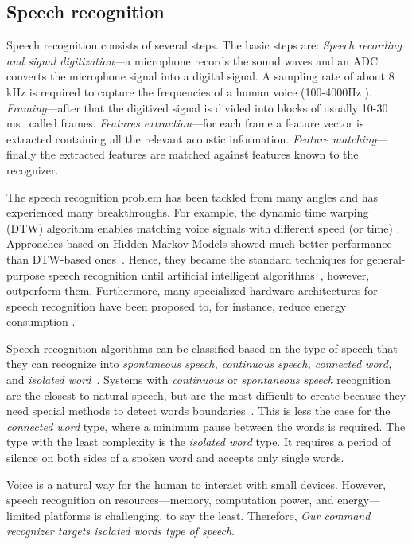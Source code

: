 \subsection{Speech recognition}
 Speech recognition consists of several steps. The basic steps are:
\textit{Speech recording and signal digitization}---a microphone records the sound waves and an ADC converts the microphone signal into a digital signal. A sampling rate of about 8 kHz is required to capture the frequencies of a human voice (100-4000Hz \cite{Bernal-Ruiz2005MicrocontrollerSystems}). \textit{Framing}---after that the digitized signal is divided into blocks of usually 10-30 ms~\cite{gaikwad2010review,delaney2002low,delaney2005energy} called frames. \textit{Features extraction}---for each frame a feature vector is extracted containing all the relevant acoustic information. \textit{Feature matching}---finally the extracted features are matched against features known to the recognizer. 

The speech recognition problem has been tackled from many angles and has experienced many breakthroughs. For example, the dynamic time warping (DTW) algorithm enables matching voice signals with different speed (or time) \cite{vintsyuk1968speech}. 
Approaches based on Hidden Markov Models showed much better performance than DTW-based ones~\cite{jelinek1997statistical}. Hence, they became the standard techniques for general-purpose speech recognition until artificial intelligent algorithms~\cite{hinton2012deep}, however, outperform them. Furthermore, many specialized hardware architectures for speech recognition have been proposed to, for instance, reduce energy consumption \cite{price2018low,price20156}. 

Speech recognition algorithms can be classified based on the type of speech that they can recognize into \textit{spontaneous speech, continuous speech, connected word,} and \textit{isolated word}~\cite{gaikwad2010review}.
Systems with \textit{continuous} or \textit{spontaneous speech} recognition are the closest to natural speech, but are the most difficult to create because they need special methods to detect words boundaries~\cite{gaikwad2010review}. This is less the case for the \textit{connected word} type, where a minimum pause between the words is required.
 The type with the least complexity is the \textit{isolated word} type. It requires a period of silence on both sides of a spoken word and accepts only single words. 
 
Voice is a natural way for the human to interact with small devices. However, speech recognition on resources---memory, computation power, and energy---limited platforms is challenging, to say the least. 
Therefore, \emph{Our command recognizer targets isolated words type of speech}. 




















